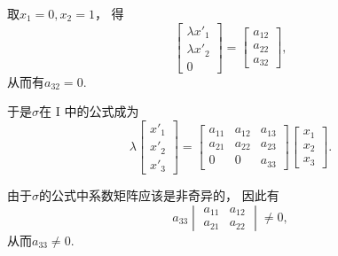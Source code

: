 取\(
	x_1 = 0,
	x_2 = 1
\)，
得\begin{equation*}
	\begin{bmatrix}
		\lambda x'_1 \\ \lambda x'_2 \\ 0
	\end{bmatrix}
	= \begin{bmatrix}
		a_{12} \\
		a_{22} \\
		a_{32}
	\end{bmatrix},
\end{equation*}
从而有\(a_{32} = 0\).

于是\(\sigma\)在 I 中的公式成为\begin{equation*}
	\lambda
	\begin{bmatrix}
		x'_1 \\ x'_2 \\ x'_3
	\end{bmatrix}
	= \begin{bmatrix}
		a_{11} & a_{12} & a_{13} \\
		a_{21} & a_{22} & a_{23} \\
		0 & 0 & a_{33}
	\end{bmatrix}
	\begin{bmatrix}
		x_1 \\ x_2 \\ x_3
	\end{bmatrix}.
\end{equation*}

由于\(\sigma\)的公式中系数矩阵应该是非奇异的，
因此有\begin{equation*}
	a_{33}
	\begin{vmatrix}
		a_{11} & a_{12} \\
		a_{21} & a_{22}
	\end{vmatrix}
	\neq 0,
\end{equation*}
从而\(a_{33} \neq 0\).

